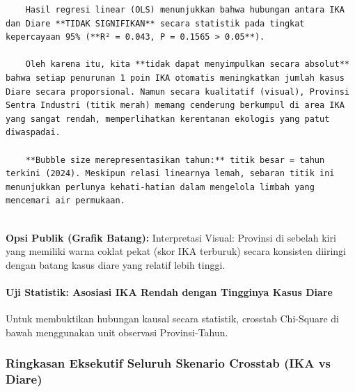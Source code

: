 \documentclass[
]{article}
\begin{document}
\begin{verbatim}
    Hasil regresi linear (OLS) menunjukkan bahwa hubungan antara IKA dan Diare **TIDAK SIGNIFIKAN** secara statistik pada tingkat kepercayaan 95% (**R² = 0.043, P = 0.1565 > 0.05**).

    Oleh karena itu, kita **tidak dapat menyimpulkan secara absolut** bahwa setiap penurunan 1 poin IKA otomatis meningkatkan jumlah kasus Diare secara proporsional. Namun secara kualitatif (visual), Provinsi Sentra Industri (titik merah) memang cenderung berkumpul di area IKA yang sangat rendah, memperlihatkan kerentanan ekologis yang patut diwaspadai.

    **Bubble size merepresentasikan tahun:** titik besar = tahun terkini (2024). Meskipun relasi linearnya lemah, sebaran titik ini menunjukkan perlunya kehati-hatian dalam mengelola limbah yang mencemari air permukaan.
    
\end{verbatim}

\textbf{Opsi Publik (Grafik Batang):} Interpretasi Visual: Provinsi di
sebelah kiri yang memiliki warna coklat pekat (skor IKA terburuk) secara
konsisten diiringi dengan batang kasus diare yang relatif lebih tinggi.

\paragraph{Uji Statistik: Asosiasi IKA Rendah dengan Tingginya Kasus
Diare}\label{uji-statistik-asosiasi-ika-rendah-dengan-tingginya-kasus-diare}

Untuk membuktikan hubungan kausal secara statistik, crosstab Chi-Square
di bawah menggunakan unit observasi Provinsi-Tahun.

\subsubsection{Ringkasan Eksekutif Seluruh Skenario Crosstab (IKA vs
Diare)}\label{ringkasan-eksekutif-seluruh-skenario-crosstab-ika-vs-diare}
\end{document}
